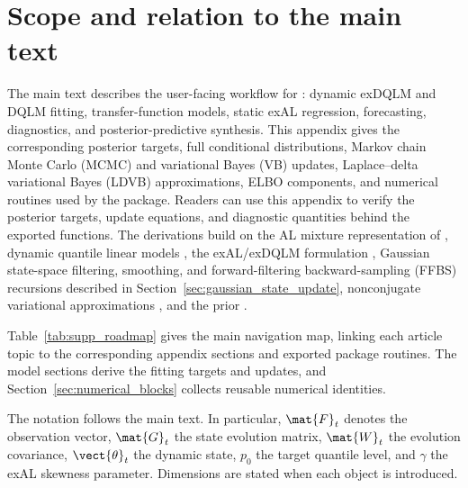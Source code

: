 
\section{Scope and relation to the main text}
\label{sec:supp_scope}

The main text describes the user-facing workflow for : dynamic
exDQLM and DQLM fitting, transfer-function models, static exAL regression,
forecasting, diagnostics, and posterior-predictive synthesis. This appendix
gives the corresponding posterior targets, full conditional distributions,
Markov chain Monte Carlo (MCMC) and variational Bayes (VB) updates,
Laplace--delta variational Bayes (LDVB) approximations, ELBO components, and
numerical routines used by the package. Readers can use this appendix to
verify the posterior targets, update equations, and diagnostic quantities
behind the exported functions. The derivations build on the AL
mixture representation of \citet{kozumi2011gibbs}, dynamic quantile linear
models \citep{gonccalves2017dynamic}, the exAL/exDQLM formulation
\citep{yan2025family,me}, Gaussian state-space filtering, smoothing, and
forward-filtering backward-sampling (FFBS) recursions described in
Section~\ref{sec:gaussian_state_update},
nonconjugate variational approximations \citep{wang2013nonconjugatevb}, and
the  prior \citep{nishimura2023shrunken}.

Table~\ref{tab:supp_roadmap} gives the main navigation map, linking each
article topic to the corresponding appendix sections and exported package
routines. The model sections derive the fitting targets and updates, and
Section~\ref{sec:numerical_blocks} collects reusable numerical identities.

The notation follows the main text. In particular, $\mat{F}_t$ denotes the
observation vector, $\mat{G}_t$ the state evolution matrix, $\mat{W}_t$ the
evolution covariance, $\vect{\theta}_t$ the dynamic state, $p_0$ the target
quantile level, and $\gamma$ the exAL skewness parameter. Dimensions are stated
when each object is introduced.

